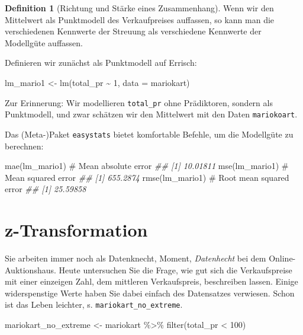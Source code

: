 \documentclass[
  a4paper,
  DIV=11]{scrreprt}
\newenvironment{Shaded}{\begin{snugshade}}{\end{snugshade}}
\newcommand{\AttributeTok}[1]{\textcolor[rgb]{0.40,0.45,0.13}{#1}}
\newcommand{\CommentTok}[1]{\textcolor[rgb]{0.37,0.37,0.37}{#1}}
\newcommand{\DecValTok}[1]{\textcolor[rgb]{0.68,0.00,0.00}{#1}}
\newcommand{\DocumentationTok}[1]{\textcolor[rgb]{0.37,0.37,0.37}{\textit{#1}}}
\newcommand{\FunctionTok}[1]{\textcolor[rgb]{0.28,0.35,0.67}{#1}}
\newcommand{\NormalTok}[1]{\textcolor[rgb]{0.00,0.23,0.31}{#1}}
\newcommand{\OtherTok}[1]{\textcolor[rgb]{0.00,0.23,0.31}{#1}}
\newcommand{\SpecialCharTok}[1]{\textcolor[rgb]{0.37,0.37,0.37}{#1}}
\theoremstyle{definition}
\theoremstyle{definition}
\theoremstyle{definition}
\newtheorem{definition}{Definition}[chapter]
\theoremstyle{remark}
\begin{document}
\begin{definition}[Richtung und Stärke eines
Zusammenhang]
Wenn wir den Mittelwert als Punktmodell des Verkaufpreises auffassen, so
kann man die verschiedenen Kennwerte der Streuung als verschiedene
Kennwerte der Modellgüte auffassen.

Definieren wir zunächst als Punktmodell auf Errisch:

\begin{Shaded}
\begin{Highlighting}[]
\NormalTok{lm\_mario1 }\OtherTok{\textless{}{-}} \FunctionTok{lm}\NormalTok{(total\_pr }\SpecialCharTok{\textasciitilde{}} \DecValTok{1}\NormalTok{, }\AttributeTok{data =}\NormalTok{ mariokart)}
\end{Highlighting}
\end{Shaded}

Zur Erinnerung: Wir modellieren \texttt{total\_pr} ohne Prädiktoren,
sondern als Punktmodell, und zwar schätzen wir den Mittelwert mit den
Daten \texttt{mariokoart}.

Das (Meta-)Paket \texttt{easystats} bietet komfortable Befehle, um die
Modellgüte zu berechnen:

\begin{Shaded}
\begin{Highlighting}[]
\FunctionTok{mae}\NormalTok{(lm\_mario1)  }\CommentTok{\# Mean absolute error}
\DocumentationTok{\#\# [1] 10.01811}
\FunctionTok{mse}\NormalTok{(lm\_mario1)  }\CommentTok{\# Mean squared error}
\DocumentationTok{\#\# [1] 655.2874}
\FunctionTok{rmse}\NormalTok{(lm\_mario1)  }\CommentTok{\# Root mean squared error}
\DocumentationTok{\#\# [1] 25.59858}
\end{Highlighting}
\end{Shaded}

\section{z-Transformation}\label{z-transformation}

Sie arbeiten immer noch als Datenknecht, Moment, \emph{Datenhecht} bei
dem Online-Auktionshaus. Heute untersuchen Sie die Frage, wie gut sich
die Verkaufspreise mit einer einzeigen Zahl, dem mittleren
Verkaufspreis, beschreiben lassen. Einige widerspenstige Werte haben Sie
dabei einfach des Datensatzes verwiesen. Schon ist das Leben leichter,
s. \texttt{mariokart\_no\_extreme}.

\begin{Shaded}
\begin{Highlighting}[]
\NormalTok{mariokart\_no\_extreme }\OtherTok{\textless{}{-}} 
\NormalTok{  mariokart }\SpecialCharTok{\%\textgreater{}\%} 
  \FunctionTok{filter}\NormalTok{(total\_pr }\SpecialCharTok{\textless{}} \DecValTok{100}\NormalTok{)}
\end{Highlighting}
\end{Shaded}


\end{definition}
\end{document}
